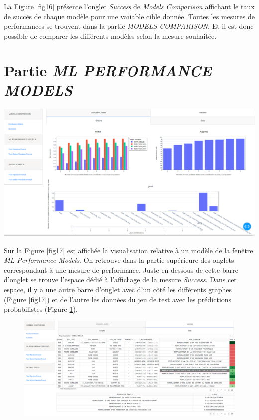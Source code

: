 La Figure \ref{fig16} présente l’onglet \textit{Success} de \textit{Models Comparison} affichant le taux de succès de chaque modèle pour une variable cible donnée. Toutes les mesures de performances se trouvent dans la partie \textit{MODELS COMPARISON}. Et il est donc possible de comparer les différents modèles selon la mesure souhaitée.

\section{Partie \textit{ML PERFORMANCE MODELS}}

\begin{center}
\includegraphics[width=1\textwidth]{figures/app_models.png}
\label{fig17}
\end{center}

Sur la Figure \ref{fig17} est affichée la visualisation relative à un modèle de la fenêtre
\textit{ML Performance Models}. On retrouve dans la partie supérieure des onglets correspondant à une mesure de performance.
Juste en dessous de cette barre d’onglet se trouve l'espace dédié à l'affichage de la mesure \textit{Success}. Dans cet espace, il y a une autre barre d’onglet avec d’un côté les différents graphes (Figure \ref{fig17}) et de l’autre les données du jeu de test avec les prédictions probabilistes (Figure \ref{fig18}).

\begin{figure}
\includegraphics[width=1\textwidth]{figures/app_models_table.png}
\label{fig18}
\end{figure}

